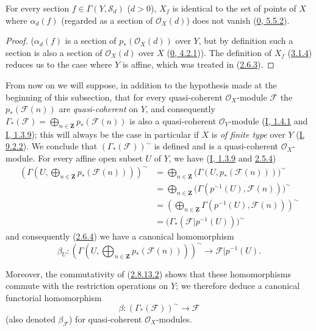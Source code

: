 \begin{proposition}[3.3.3]
\label{II.3.3.3}
For every section $f\in\Gamma(Y,\mathcal{S}_d)$ ($d>0$), $X_f$ is identical
to the set of points of $X$ where $\alpha_d(f)$ (regarded as a section of
$\mathcal{O}_X(d)$) does not vanish
(\hyperref[0.5.5.2]{0, 5.5.2}).
\end{proposition}

\begin{proof}
($\alpha_d(f)$ is a section of $p_*(\mathcal{O}_X(d))$ over $Y$, but by
definition such a section is also a section of $\mathcal{O}_X(d)$ over $X$
(\hyperref[0.4.2.1]{0, 4.2.1})). The definition of $X_f$
(\hyperref[II.3.1.4]{3.1.4}) reduces us to the case where $Y$ is affine,
which was treated in (\hyperref[II.2.6.3]{2.6.3}).
\end{proof}

\begin{env}[3.3.4]
\label{II.3.3.4}
From now on we will suppose, in addition to the hypothesis made at the
beginning of this subsection, that for every quasi-coherent
$\mathcal{O}_X$-module $\mathcal{F}$ the $p_*(\mathcal{F}(n))$ are
\emph{quasi-coherent} on $Y$, and consequently
$\Gamma_*(\mathcal{F})=\bigoplus_{n\in\mathbf{Z}}p_*(\mathcal{F}(n))$ is
also a quasi-coherent $\mathcal{O}_Y$-module
(\hyperref[I.1.4.1]{I, 1.4.1} and
\hyperref[I.1.3.9]{I, 1.3.9}); this will always be the case in particular
if $X$ is \emph{of finite type} over $Y$
(\hyperref[I.9.2.2]{I, 9.2.2}). We conclude that
$(\Gamma_*(\mathcal{F}))^{\sim}$ is defined and is a quasi-coherent
$\mathcal{O}_X$-module. For every affine open subset $U$ of $Y$, we
have (\hyperref[I.1.3.9]{I, 1.3.9} and
\hyperref[II.2.5.4]{2.5.4})
\begin{align*}
  \left(\Gamma\left(U,\bigoplus_{n\in\mathbf{Z}}
  p_*(\mathcal{F}(n))\right)\right)^{\sim}
  &=\bigoplus_{n\in\mathbf{Z}}
  \bigl(\Gamma(U,p_*(\mathcal{F}(n)))\bigr)^{\sim}\\
  &=\bigoplus_{n\in\mathbf{Z}}
  \bigl(\Gamma(p^{-1}(U),\mathcal{F}(n))\bigr)^{\sim}\\
  &=\left(\bigoplus_{n\in\mathbf{Z}}
  \Gamma(p^{-1}(U),\mathcal{F}(n))\right)^{\sim}\\
  &=\bigl(\Gamma_*(\mathcal{F}|p^{-1}(U))\bigr)^{\sim}
\end{align*}
and consequently (\hyperref[II.2.6.4]{2.6.4}) we have a canonical
homomorphism
\[
  \beta_U:\left(\Gamma\left(U,\bigoplus_{n\in\mathbf{Z}}
  p_*(\mathcal{F}(n))\right)\right)^{\sim}
  \longrightarrow\mathcal{F}|p^{-1}(U).
\]

Moreover, the commutativity of
(\hyperref[II.2.8.13.2]{2.8.13.2}) shows that these homomorphisms commute
with the restriction operations on $Y$; we therefore deduce a canonical
functorial homomorphism
\[
\label{II.3.3.4.1}
  \beta:(\Gamma_*(\mathcal{F}))^{\sim}\longrightarrow\mathcal{F}
\tag{3.3.4.1}
\]
(also denoted $\beta_{\mathcal{F}}$) for quasi-coherent
$\mathcal{O}_X$-modules.
\end{env}

